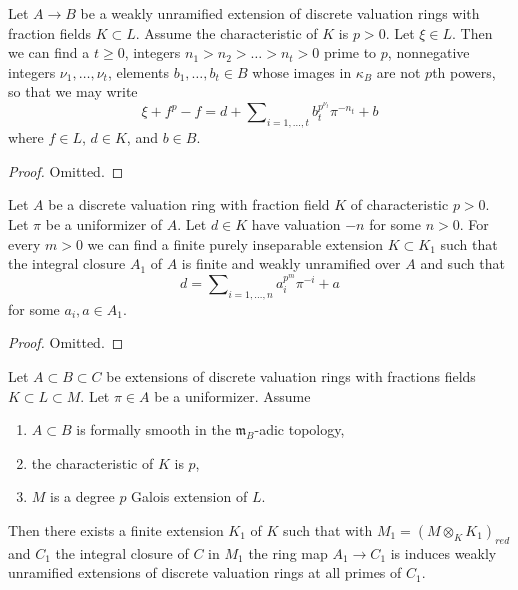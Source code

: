 \begin{lemma}
\label{lemma-modify-element}
Let $A \to B$ be a weakly unramified extension of discrete valuation rings
with fraction fields $K \subset L$. Assume the characteristic of $K$ is
$p > 0$. Let $\xi \in L$. Then we can find a $t \geq 0$, integers
$n_1 > n_2 > \ldots > n_t > 0$ prime to $p$, nonnegative integers
$\nu_1, \ldots, \nu_t$, elements $b_1, \ldots, b_t \in B$ whose images
in $\kappa_B$ are not $p$th powers, so that we may write
$$
\xi + f^p - f =
d + \sum\nolimits_{i = 1, \ldots, t} b_t^{p^{\nu_t}} \pi^{-n_t} + b
$$
where $f \in L$, $d \in K$, and $b \in B$.
\end{lemma}

\begin{proof}
Omitted.
\end{proof}

\begin{lemma}
\label{lemma-element-of-A}
Let $A$ be a discrete valuation ring with fraction field $K$
of characteristic $p > 0$. Let $\pi$ be a uniformizer of $A$.
Let $d \in K$ have valuation $-n$ for some $n > 0$. For every $m > 0$
we can find a finite purely inseparable extension $K \subset K_1$
such that the integral closure $A_1$ of $A$ is finite
and weakly unramified over $A$ and such that
$$
d = \sum\nolimits_{i = 1, \ldots, n} a_i^{p^m} \pi^{-i} + a
$$
for some $a_i, a \in A_1$.
\end{lemma}

\begin{proof}
Omitted.
\end{proof}

\begin{lemma}
\label{lemma-characteristic-p-case}
Let $A \subset B \subset C$ be extensions of discrete valuation rings
with fractions fields $K \subset L \subset M$. Let $\pi \in A$ be a
uniformizer. Assume
\begin{enumerate}
\item $A \subset B$ is formally smooth in the $\mathfrak m_B$-adic
topology,
\item the characteristic of $K$ is $p$,
\item $M$ is a degree $p$ Galois extension of $L$.
\end{enumerate}
Then there exists a finite extension $K_1$ of $K$ such that 
with $M_1 = (M \otimes_K K_1)_{red}$ and $C_1$ the integral
closure of $C$ in $M_1$ the ring map $A_1 \to C_1$
is induces weakly unramified extensions of discrete valuation rings
at all primes of $C_1$.
\end{lemma}

